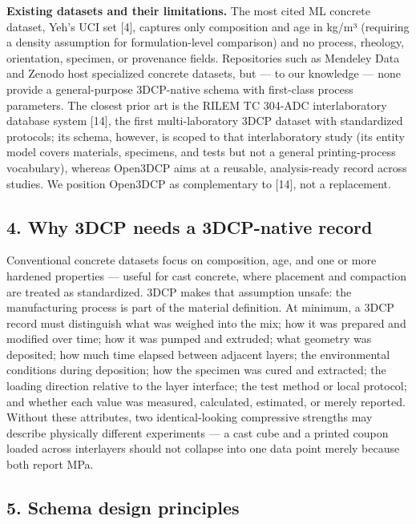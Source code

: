 \documentclass[
  11pt,
  letterpaper,
]{article}
\newcounter{none} %
\begin{document}
\textbf{Existing datasets and their limitations.} The most cited ML
concrete dataset, Yeh's UCI set {[}4{]}, captures only composition and
age in kg/m³ (requiring a density assumption for formulation-level
comparison) and no process, rheology, orientation, specimen, or
provenance fields. Repositories such as Mendeley Data and Zenodo host
specialized concrete datasets, but --- to our knowledge --- none provide
a general-purpose 3DCP-native schema with first-class process
parameters. The closest prior art is the RILEM TC 304-ADC
interlaboratory database system {[}14{]}, the first multi-laboratory
3DCP dataset with standardized protocols; its schema, however, is scoped
to that interlaboratory study (its entity model covers materials,
specimens, and tests but not a general printing-process vocabulary),
whereas Open3DCP aims at a reusable, analysis-ready record across
studies. We position Open3DCP as complementary to {[}14{]}, not a
replacement.

\subsection{4. Why 3DCP needs a 3DCP-native
record}\label{why-3dcp-needs-a-3dcp-native-record}

Conventional concrete datasets focus on composition, age, and one or
more hardened properties --- useful for cast concrete, where placement
and compaction are treated as standardized. 3DCP makes that assumption
unsafe: the manufacturing process is part of the material definition. At
minimum, a 3DCP record must distinguish what was weighed into the mix;
how it was prepared and modified over time; how it was pumped and
extruded; what geometry was deposited; how much time elapsed between
adjacent layers; the environmental conditions during deposition; how the
specimen was cured and extracted; the loading direction relative to the
layer interface; the test method or local protocol; and whether each
value was measured, calculated, estimated, or merely reported. Without
these attributes, two identical-looking compressive strengths may
describe physically different experiments --- a cast cube and a printed
coupon loaded across interlayers should not collapse into one data point
merely because both report MPa.

\subsection{5. Schema design principles}\label{schema-design-principles}
\end{document}
